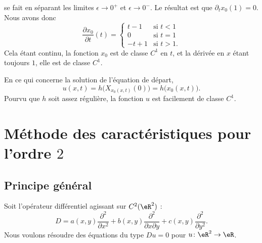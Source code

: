 \begin{example}
    se fait en séparant les limites \( \epsilon\to 0^+\) et \( \epsilon\to 0^-\). Le résultat est que \( \partial_tx_0(1)=0\). Nous avons donc
    \begin{equation}
        \frac{ \partial x_0 }{ \partial t }(t)=\begin{cases}
            t-1    &   \text{si } t<1\\
            0    &    \text{si } t=1\\
            -t+1    &    \text{si }t>1.
        \end{cases}
    \end{equation}
    Cela étant continu, la fonction \( x_0\) est de classe \( C^1\) en \( t\), et la dérivée en \( x\) étant toujours \( 1\), elle est de classe \( C^1\).

    En ce qui concerne la solution de l'équation de départ,
    \begin{equation}
        u(x,t)=h\big( X_{x_0(x,t)}(0) \big)=h\big( x_0(x,t) \big).
    \end{equation}
    Pourvu que \( h\) soit assez régulière, la fonction \( u\) est facilement de classe \( C^1\).
\end{example}

\section{Méthode des caractéristiques pour l'ordre \( 2\)}

\subsection{Principe général}

Soit l'opérateur différentiel agissant sur \( C^2(\eR^2)\) :
\begin{equation}
    D=a(x,y)\frac{ \partial^2 }{ \partial x^2 }+b(x,y)\frac{ \partial^2 }{ \partial x\partial y }+c(x,y)\frac{ \partial^2 }{ \partial y^2 }.
\end{equation}
Nous voulons résoudre des équations du type \( Du=0\) pour \( u\colon \eR^2\to \eR\).

